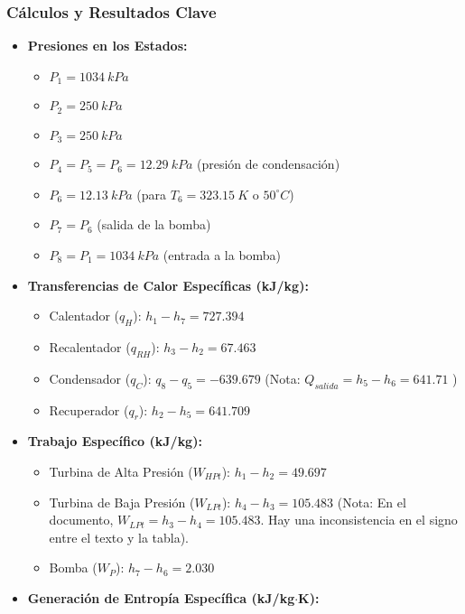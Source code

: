 \documentclass{beamer}
\begin{document}
\begin{frame}
    \frametitle{Cálculos y Resultados Clave}
    \begin{multicols}{2}
    \begin{itemize}
        \item \textbf{Presiones en los Estados:}
        \begin{itemize}
            \item $P_1 = 1034~kPa$ 
            \item $P_2 = 250~kPa$ 
            \item $P_3 = 250~kPa$ 
            \item $P_4 = P_5 = P_6 = 12.29~kPa$ (presión de condensación) 
            \item $P_6 = 12.13~kPa$ (para $T_6 = 323.15~K$ o $50^{\circ}C$) 
            \item $P_7 = P_6$ (salida de la bomba) 
            \item $P_8 = P_1 = 1034~kPa$ (entrada a la bomba) 
        \end{itemize}
        \item \textbf{Transferencias de Calor Específicas (kJ/kg):} 
        \begin{itemize}
            \item Calentador ($q_H$): $h_1 - h_7 = 727.394$ 
            \item Recalentador ($q_{RH}$): $h_3 - h_2 = 67.463$ 
            \item Condensador ($q_C$): $q_8 - q_5 = -639.679$  (Nota: $Q_{salida}=h_5-h_6=641.71$ )
            \item Recuperador ($q_r$): $h_2 - h_5 = 641.709$ 
        \end{itemize}
        \item \textbf{Trabajo Específico (kJ/kg):}
        \begin{itemize}
            \item Turbina de Alta Presión ($W_{HPt}$): $h_1 - h_2 = 49.697$ 
            \item Turbina de Baja Presión ($W_{LPt}$): $h_4 - h_3 = 105.483$  (Nota: En el documento, $W_{LPt}=h_3-h_4=105.483$. Hay una inconsistencia en el signo entre el texto y la tabla).
            \item Bomba ($W_P$): $h_7 - h_6 = 2.030$ 
        \end{itemize}
    \end{itemize}
    \columnbreak
    \begin{itemize}
        \item \textbf{Generación de Entropía Específica (kJ/kg$\cdot$K):}

\end{itemize}
\end{multicols}
\end{frame}
\end{document}
